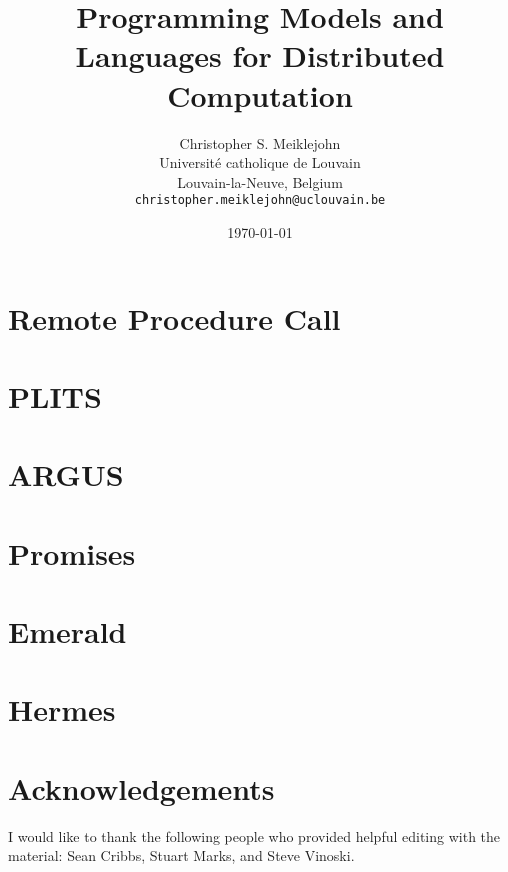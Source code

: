 \documentclass[11pt,twoside,a4paper]{article}
\theoremstyle{definition}
\theoremstyle{definition}
\theoremstyle{remark}
\begin{document}
\title{Programming Models and Languages for Distributed Computation}

\author{Christopher S. Meiklejohn\\
  Universit\'e catholique de Louvain\\
  Louvain-la-Neuve, Belgium\\
  \texttt{christopher.meiklejohn@uclouvain.be}}
  
\date{\today}
\maketitle
\clearpage

\tableofcontents

\clearpage

\section{Remote Procedure Call}

\clearpage

\section{PLITS}

\clearpage

\section{ARGUS}

\clearpage

\section{Promises}

\clearpage

\section{Emerald}

\clearpage

\section{Hermes}

\clearpage

\section*{Acknowledgements}
I would like to thank the following people who provided helpful editing with the material: Sean Cribbs, Stuart Marks, and Steve Vinoski.

\clearpage



\end{document}
